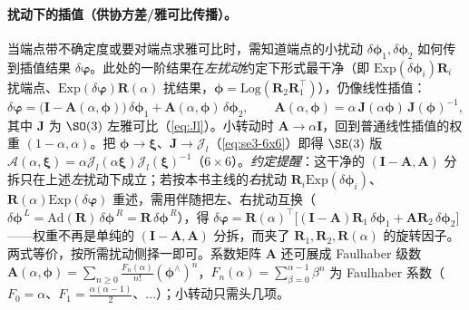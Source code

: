 \paragraph{扰动下的插值（供协方差/雅可比传播）。}
当端点带不确定度或要对端点求雅可比时，需知道端点的小扰动 $\delta\boldsymbol{\phi}_1,\delta\boldsymbol{\phi}_2$ 如何传到插值结果 $\delta\boldsymbol{\varphi}$。此处的一阶结果在\emph{左扰动}约定下形式最干净（即 $\mathrm{Exp}(\delta\boldsymbol{\phi}_i)\mathbf{R}_i$ 扰端点、$\mathrm{Exp}(\delta\boldsymbol{\varphi})\mathbf{R}(\alpha)$ 扰结果，$\boldsymbol{\phi}=\mathrm{Log}(\mathbf{R}_2\mathbf{R}_1^\top)$），仍像线性插值\cite{barfoot2024state}：
\begin{equation}
  \delta\boldsymbol{\varphi}=\big(\mathbf{I}-\mathbf{A}(\alpha,\boldsymbol{\phi})\big)\,\delta\boldsymbol{\phi}_1+\mathbf{A}(\alpha,\boldsymbol{\phi})\,\delta\boldsymbol{\phi}_2,
  \qquad
  \mathbf{A}(\alpha,\boldsymbol{\phi})=\alpha\,\mathbf{J}(\alpha\boldsymbol{\phi})\,\mathbf{J}(\boldsymbol{\phi})^{-1},
  \label{eq:interp-perturb}
\end{equation}
其中 $\mathbf{J}$ 为 $\SO(3)$ 左雅可比（\cref{eq:Jl}）。小转动时 $\mathbf{A}\to\alpha\mathbf{I}$，回到普通线性插值的权重 $(1-\alpha,\alpha)$。把 $\boldsymbol{\phi}\to\boldsymbol{\xi}$、$\mathbf{J}\to\boldsymbol{\mathcal{J}}_l$（\cref{eq:se3-6x6}）即得 $\SE(3)$ 版 $\boldsymbol{\mathcal{A}}(\alpha,\boldsymbol{\xi})=\alpha\boldsymbol{\mathcal{J}}_l(\alpha\boldsymbol{\xi})\boldsymbol{\mathcal{J}}_l(\boldsymbol{\xi})^{-1}$（$6\times6$）。\emph{约定提醒}：这干净的 $(\mathbf{I}-\mathbf{A},\mathbf{A})$ 分拆只在上述\emph{左}扰动下成立；若按本书主线的\emph{右}扰动 $\mathbf{R}_i\mathrm{Exp}(\delta\boldsymbol{\phi}_i)$、$\mathbf{R}(\alpha)\mathrm{Exp}(\delta\boldsymbol{\varphi})$ 重述，需用伴随把左、右扰动互换（$\delta\boldsymbol{\phi}^{\,L}=\mathrm{Ad}(\mathbf{R})\,\delta\boldsymbol{\phi}^{\,R}=\mathbf{R}\,\delta\boldsymbol{\phi}^{\,R}$），得 $\delta\boldsymbol{\varphi}=\mathbf{R}(\alpha)^\top\big[(\mathbf{I}-\mathbf{A})\mathbf{R}_1\,\delta\boldsymbol{\phi}_1+\mathbf{A}\mathbf{R}_2\,\delta\boldsymbol{\phi}_2\big]$——权重不再是单纯的 $(\mathbf{I}-\mathbf{A},\mathbf{A})$ 分拆，而夹了 $\mathbf{R}_1,\mathbf{R}_2,\mathbf{R}(\alpha)$ 的旋转因子。两式等价，按所需扰动侧择一即可。系数矩阵 $\mathbf{A}$ 还可展成 Faulhaber 级数 $\mathbf{A}(\alpha,\boldsymbol{\phi})=\sum_{n\ge0}\frac{F_n(\alpha)}{n!}(\boldsymbol{\phi}^\wedge)^n$，$F_n(\alpha)=\sum_{\beta=0}^{\alpha-1}\beta^n$ 为 Faulhaber 系数（$F_0=\alpha$、$F_1=\tfrac{\alpha(\alpha-1)}{2}$、$\dots$）；小转动只需头几项。

